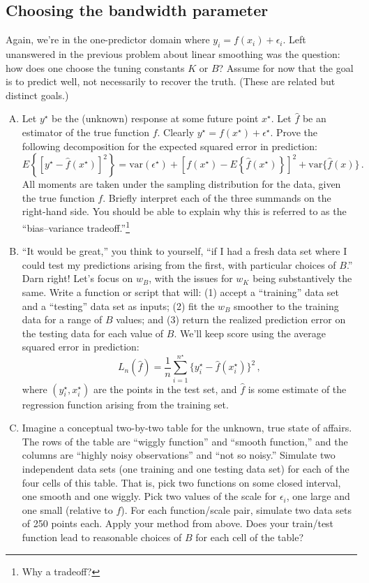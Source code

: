 \documentclass{mynotes}
\begin{document}
\subsection{Choosing the bandwidth parameter}

Again, we're in the one-predictor domain where $y_i = f(x_i) + \epsilon_i$.  Left unanswered in the previous problem about linear smoothing was the question: how does one choose the tuning constants $K$ or $B$?  Assume for now that the goal is to predict well, not necessarily to recover the truth.  (These are related but distinct goals.)  

\begin{enumerate}[(A)]

\item Let $y^{\star}$ be the (unknown) response at some future point $x^{\star}$.  Let $\hat{f}$ be an estimator of the true function $f$.  Clearly $y^{\star} = f(x^{\star}) + \epsilon^{\star}$.  Prove the following decomposition for the expected squared error in prediction:
$$
E \left\{ \left[ y^{\star} - \hat{f}(x^{\star}) \right]^2 \right\} =
\mbox{var}(\epsilon^{\star}) + 
\left[ f(x^{\star}) - E \left\{  \hat{f} (x^{\star}) \right\} \right]^2
+   \mbox{var}\{ \hat{f}(x) \} \, .
$$
All moments are taken under the sampling distribution for the data, given the true function $f$.  Briefly interpret each of the three summands on the right-hand side.  You should be able to explain why this is referred to as the ``bias--variance tradeoff.''\footnote{Why a tradeoff?}

\item  ``It would be great,'' you think to yourself, ``if I had a fresh data set where I could test my predictions arising from the first, with particular choices of $B$.''  Darn right!   Let's focus on $w_B$, with the issues for $w_K$ being substantively the same.  Write a function or script that will: (1) accept a ``training'' data set and a ``testing'' data set as inputs; (2) fit the $w_B$ smoother to the training data for a range of $B$ values; and (3) return the realized prediction error on the testing data for each value of $B$.  We'll keep score using the average squared error in prediction:
$$
L_n(\hat{f}) = \frac{1}{n}\sum_{i=1}^{n^{\star}} \{y^{\star}_i - \hat{f}(x_i^{\star})\}^2 \, ,
$$
where $(y_i^{\star}, x_i^{\star})$ are the points in the test set, and $\hat{f}$ is some estimate of the regression function arising from the training set.

\item Imagine a conceptual two-by-two table for the unknown, true state of affairs.  The rows of the table are ``wiggly function'' and ``smooth function,'' and the columns are ``highly noisy observations'' and ``not so noisy.''  Simulate two independent data sets (one training and one testing data set) for each of the four cells of this table.  That is, pick two functions on some closed interval, one smooth and one wiggly.  Pick two values of the scale for $\epsilon_i$, one large and one small (relative to $f$).  For each function/scale pair, simulate two data sets of 250 points each.  Apply your method from above.  Does your train/test function lead to reasonable choices of $B$ for each cell of the table?


\end{enumerate}
\end{document}
